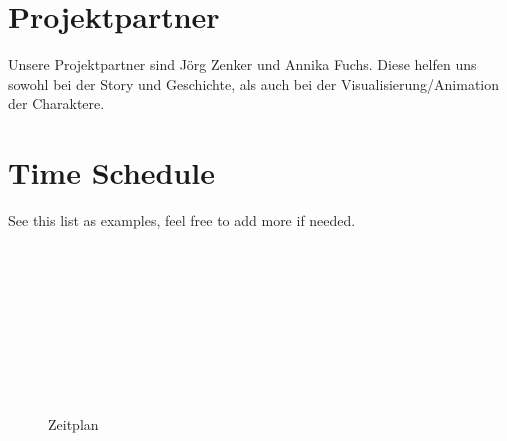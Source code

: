 \documentclass[]{hci-proposal}
\begin{document}

\section{Projektpartner}
Unsere Projektpartner sind Jörg Zenker und Annika Fuchs. Diese helfen uns sowohl bei der Story und Geschichte,
als auch bei der Visualisierung/Animation der Charaktere.

\section{Time Schedule}
See this list as examples, feel free to add more if needed.



  \begin{figure*}[htbp]
  \begin{ganttchart}[vgrid, hgrid, y unit chart=0.7cm]{1}{20}
     \\
     \\
      
     \\
      

     \\
     \\
     \\
     \\
     \\


 


  \end{ganttchart}
  \label{gc}
  \caption{Zeitplan}
\end{figure*}

\end{document}
